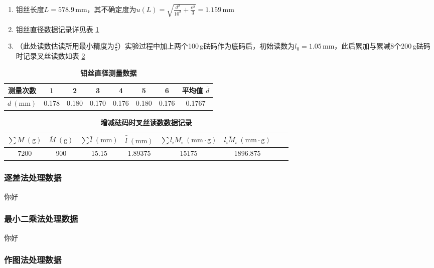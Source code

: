 \documentclass[zihao=5, UTF8]{article}
\theoremstyle{MyLineTheoremStyle} %
\theoremstyle{MyBlockTheoremStyle} %
\theoremstyle{MySubsubsectionStyle} %
\begin{document}
\begin{enumerate}
    \item 钼丝长度$ L=578.9\,\mathrm{mm} $，其不确定度为$ u(L)=\sqrt{\frac{d^2}{10^2}+\frac{e^2}{3}}=1.159\,\mathrm{mm} $
    \item 钼丝直径数据记录详见表 \ref{钼丝直径测量数据}
    \item （此处读数估读所用最小精度为$ \frac d5 $）实验过程中加上两个100\,g砝码作为底码后，初始读数为$ l_0=1.05\,\mathrm{mm} $，此后累加与累减8个200\,g砝码时记录叉丝读数如表 \ref{增减砝码时叉丝读数数据记录}
\end{enumerate}

\begin{table}[H]
    \centering
    \caption{\textbf{钼丝直径测量数据}}
    \label{钼丝直径测量数据}
    \begin{tabular}{cccccccc}
    \toprule
    测量次数 &1&2&3&4&5&6& 平均值 $\bar{d}$ \\
    \midrule
    $d\ (\mathrm{mm})$ &0.178&0.180&0.170&0.176&0.180&0.176&0.1767\\ 
    \bottomrule
    \end{tabular}
\end{table}

\begin{table}[H]
    \centering
    \caption{\textbf{增减砝码时叉丝读数数据记录}}
    \label{增减砝码时叉丝读数数据记录}
    \begin{tabular}{cccccccc}
    \toprule
    $ \sum M\;(\mathrm g) $&$ \overline M\;(\mathrm g) $&$ \sum\bar l\;(\mathrm{mm}) $&$ \bar{\bar l}\;(\mathrm{mm}) $&$ \sum l_iM_i\;(\mathrm{mm\cdot g}) $&$ \overline{l_iM_i}\;(\mathrm{mm\cdot g}) $\\
    \midrule
    7200&900&15.15&1.89375&15175&1896.875\\ 
    \bottomrule
    \end{tabular}
\end{table}

\subsubsection{逐差法处理数据}
你好
\subsubsection{最小二乘法处理数据}
你好
\subsubsection{作图法处理数据}
\end{document}
